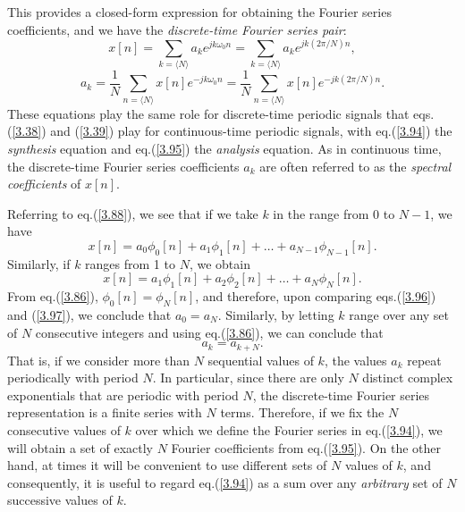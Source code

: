 \documentclass[a4paper,10pt,twoside]{book}
\begin{document}
This provides a closed-form expression for obtaining the Fourier series coefficients, and we have the \textit{discrete-time Fourier series pair}:
\begin{equation}
    x[n]=\sum_{k=\langle N\rangle}a_{k}e^{jk\omega_{0}n}=\sum_{k=\langle N\rangle}a_{k}e^{jk(2\pi/N)n},
    \label{3.94}
\end{equation}
\begin{equation}
    a_{k}=\frac{1}{N}\sum_{n=\langle N\rangle}x[n]e^{-jk\omega_{0}n}=\frac{1}{N}\sum_{n=\langle N\rangle}x[n]e^{-jk(2\pi/N)n}.
    \label{3.95}
\end{equation}
These equations play the same role for discrete-time periodic signals that eqs.\;(\ref{3.38}) and (\ref{3.39}) play for continuous-time periodic signals, with eq.\;(\ref{3.94}) the \textit{synthesis} equation and eq.\;(\ref{3.95}) the \textit{analysis} equation. As in continuous time, the discrete-time Fourier series coefficients $a_k$ are often referred to as the \textit{spectral coefficients} of $x[n]$.

Referring to eq.\;(\ref{3.88}), we see that if we take $k$ in the range from 0 to $N-1$, we have
\begin{equation}
    x[n]=a_0\phi_0[n]+a_1\phi_1[n]+\ldots+a_{N-1}\phi_{N-1}[n].
    \label{3.96}
\end{equation}
Similarly, if $k$ ranges from 1 to $N$, we obtain
\begin{equation}
    x[n]=a_1\phi_1[n]+a_2\phi_2[n]+\ldots+a_N\phi_N[n].
    \label{3.97}
\end{equation}
From eq.\;(\ref{3.86}), $\phi_0[n]=\phi_N[n]$, and therefore, upon comparing eqs.\;(\ref{3.96}) and (\ref{3.97}), we conclude that $a_0=a_N$. Similarly, by letting $k$ range over any set of $N$ consecutive integers and using eq.\;(\ref{3.86}), we can conclude that
\begin{equation}
    a_k=a_{k+N}.
    \label{3.98}
\end{equation}
That is, if we consider more than $N$ sequential values of $k$, the values $a_k$ repeat periodically with period $N$. In particular, since there are only $N$ distinct complex exponentials that are periodic with period $N$, the discrete-time Fourier series representation is a finite series with $N$ terms. Therefore, if we fix the $N$ consecutive values of $k$ over which we define the Fourier series in eq.\;(\ref{3.94}), we will obtain a set of exactly $N$ Fourier coefficients from eq.\;(\ref{3.95}). On the other hand, at times it will be convenient to use different sets of $N$ values of $k$, and consequently, it is useful to regard eq.\;(\ref{3.94}) as a sum over any \textit{arbitrary} set of $N$ successive values of $k$.
\end{document}

